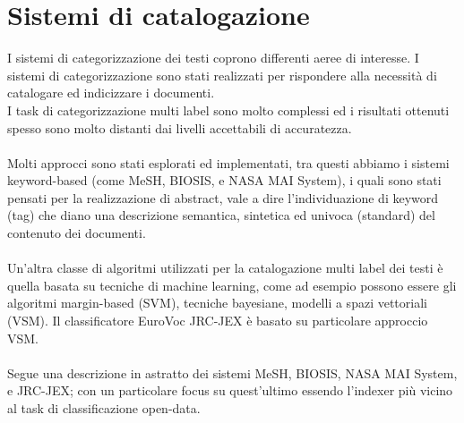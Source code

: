 \documentclass{article}
\theoremstyle{plain}
\theoremstyle{definition}
\begin{document}
\newpage
\section{Sistemi di catalogazione}
I sistemi di categorizzazione dei testi coprono differenti aeree di interesse. I sistemi di categorizzazione sono stati realizzati per rispondere alla necessità di catalogare ed indicizzare i documenti. 
\\
I task di categorizzazione multi label sono molto complessi ed i risultati ottenuti spesso sono molto distanti dai livelli accettabili di accuratezza.
\\
\\
Molti approcci sono stati esplorati ed implementati, tra questi abbiamo i sistemi keyword-based (come MeSH, BIOSIS, e NASA MAI System), i quali sono stati pensati per la realizzazione di abstract, vale a dire l'individuazione di keyword (tag) che diano una descrizione semantica, sintetica ed univoca (standard) del contenuto dei documenti. 
\\
\\
Un'altra classe di algoritmi utilizzati per la catalogazione multi label dei testi è quella basata su tecniche di machine learning, come ad esempio possono essere gli algoritmi margin-based (SVM), tecniche bayesiane, modelli a spazi vettoriali (VSM). Il classificatore EuroVoc JRC-JEX è basato su particolare approccio VSM.
\\
\\
Segue una descrizione in astratto dei sistemi MeSH, BIOSIS, NASA MAI System, e JRC-JEX; con un particolare focus su quest'ultimo essendo l'indexer più vicino al task di classificazione open-data.
\end{document}
